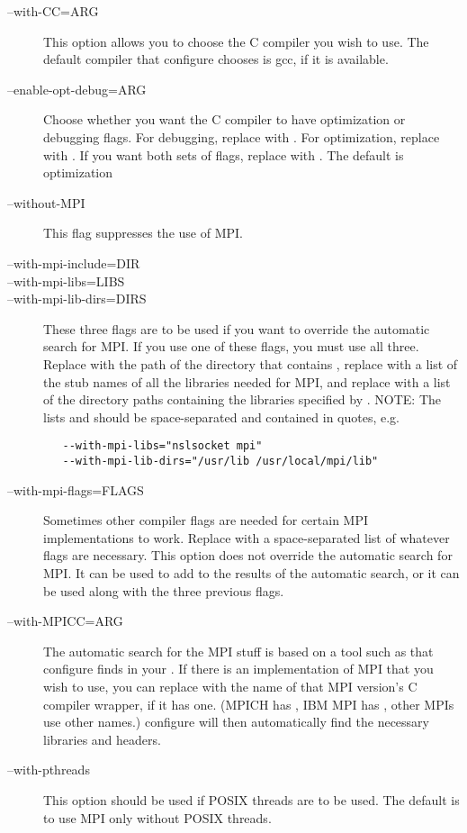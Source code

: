 \begin{description}

\item[--with-CC=ARG] This option allows you to choose the C compiler
you wish to use.  The default compiler that configure chooses is gcc,
if it is available.

\item[--enable-opt-debug=ARG] Choose whether you want the C compiler
to have optimization or debugging flags.  For debugging, replace
 with .  For optimization, replace  with
.  If you want both sets of flags, replace  with
.  The default is optimization

\item[--without-MPI] This flag suppresses the use of MPI.

\item[--with-mpi-include=DIR]
\item[--with-mpi-libs=LIBS]
\item[--with-mpi-lib-dirs=DIRS] These three flags are to be used if
you want to override the automatic search for MPI.  If you use one of
these flags, you must use all three.  Replace  with the path
of the directory that contains , replace  with a
list of the stub names of all the libraries needed for MPI, and
replace  with a list of the directory paths containing the
libraries specified by .  NOTE: The lists  and
 should be space-separated and contained in quotes, e.g.
\begin{verbatim}
   --with-mpi-libs="nslsocket mpi"
   --with-mpi-lib-dirs="/usr/lib /usr/local/mpi/lib"
\end{verbatim}

\item[--with-mpi-flags=FLAGS] Sometimes other compiler flags are
needed for certain MPI implementations to work.  Replace 
with a space-separated list of whatever flags are necessary.  This
option does not override the automatic search for MPI.  It can be used
to add to the results of the automatic search, or it can be used along
with the three previous flags.

\item[--with-MPICC=ARG] The automatic search for the MPI stuff is
based on a tool such as  that configure finds in your
.  If there is an implementation of MPI that you wish to
use, you can replace  with the name of that MPI version's C
compiler wrapper, if it has one.  (MPICH has , IBM MPI has
, other MPIs use other names.)  configure will then
automatically find the necessary libraries and headers.

\item[--with-pthreads] This option should be used if POSIX threads
are to be used.  The default is to use MPI only without POSIX threads.

\end{description}

